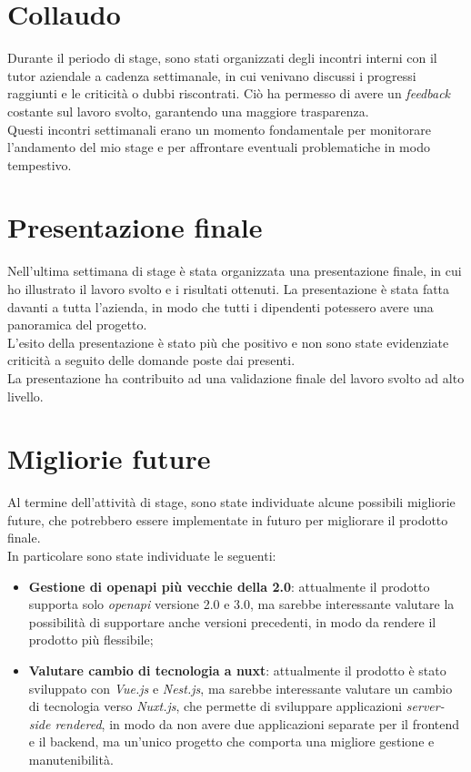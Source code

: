 \section{Collaudo}
Durante il periodo di stage, sono stati organizzati degli incontri interni con il tutor aziendale a cadenza settimanale, in cui venivano discussi i progressi
raggiunti e le criticità o dubbi riscontrati. Ciò ha permesso di avere un \textit{feedback} costante sul lavoro svolto, garantendo una maggiore trasparenza.\\
Questi incontri settimanali erano un momento fondamentale per monitorare l'andamento del mio stage e per affrontare eventuali problematiche in modo tempestivo.


\section{Presentazione finale}
Nell'ultima settimana di stage è stata organizzata una presentazione finale, in cui ho illustrato il lavoro svolto e i risultati ottenuti.
La presentazione è stata fatta davanti a tutta l'azienda, in modo che tutti i dipendenti potessero avere una panoramica del progetto.\\
L'esito della presentazione è stato più che positivo e non sono state evidenziate criticità a seguito delle domande poste dai presenti.\\
La presentazione ha contribuito ad una validazione finale del lavoro svolto ad alto livello.

\section{Migliorie future}
Al termine dell'attività di stage, sono state individuate alcune possibili migliorie future, che potrebbero essere implementate in futuro per migliorare
il prodotto finale.\\
In particolare sono state individuate le seguenti:
\begin{itemize}
  \item \textbf{Gestione di openapi più vecchie della 2.0}: attualmente il prodotto supporta solo \textit{openapi} versione 2.0 e 3.0, ma sarebbe interessante valutare la possibilità di supportare anche versioni precedenti, in modo da rendere il prodotto più flessibile;
  \item \textbf{Valutare cambio di tecnologia a nuxt}: attualmente il prodotto è stato sviluppato con \textit{Vue.js} e \textit{Nest.js}, ma sarebbe interessante valutare un cambio di tecnologia verso \textit{Nuxt.js}, che permette di sviluppare applicazioni \textit{server-side rendered}, 
  in modo da non avere due applicazioni separate per il frontend e il backend, ma un'unico progetto che comporta una migliore gestione e manutenibilità.
\end{itemize}